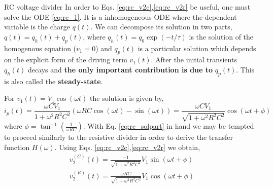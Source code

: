 \begin{frame}{RC voltage divider}
In order to Eqs. \ref{eq:rc_v2c},\ref{eq:rc_v2r} be useful, one must solve the ODE \ref{eq:rc_1}. It is a inhomogeneous ODE where the dependent variable is the charge $q(t)$. We can decompose its solution in two parts, $q(t)=q_h(t)+q_p(t)$, where $q_h(t)=q_0 \exp(-t/\tau)$ is the solution of the homogenous equation ($v_1=0$) and $q_p(t)$ is a particular solution which depends on the explicit form of the driving term $v_1(t)$. After the initial transients $q_h(t)$ decays and \textbf{the only important contribution is due to} $q_p(t)$. This is also called the \textbf{steady-state}.

For $v_1(t)=V_1\cos(\omega t)$ the solution is given by, 
\begin{equation}
i_p(t)=\frac{\omega C V_1 }{1+\omega^2 R^2 C^2}(\omega R C\cos(\omega t)-\sin(\omega t))=\frac{\omega C V_1 }{\sqrt{1+\omega^2 R^2 C^2}}\cos(\omega t +\phi)
\label{eq:rc_solpart}
\end{equation}
where $\phi=\tan^{-1}(\frac{1}{\omega R C})$. With Eq. \ref{eq:rc_solpart} in hand we may be tempted to proceed similarly to the resistive divider in order to derive the transfer function $H(\omega)$. Using Eqs. \ref{eq:rc_v2c},\ref{eq:rc_v2r} we obtain,
\begin{eqnarray}
v_2^{(C)}(t)=\frac{-1}{\sqrt{1+\omega^2 R^2 C^2}} V_1 \sin(\omega t +\phi) \label{eq:rc_v2final_c}\\
v_2^{(R)}(t)=\frac{\omega R C }{\sqrt{1+\omega^2 R^2 C^2}} V_1 \cos(\omega t +\phi) \label{eq:rc_v2final_r}
\end{eqnarray}

\end{frame}

